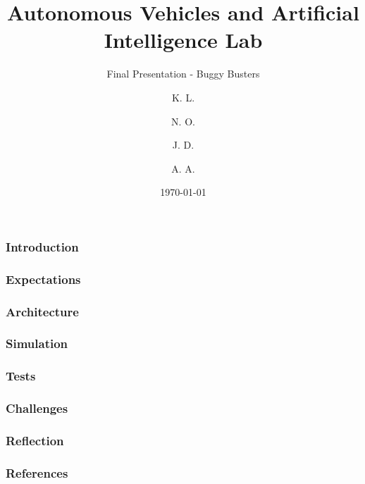 \documentclass{beamer}
\title{Autonomous Vehicles and Artificial Intelligence Lab}
\subtitle{Final Presentation - Buggy Busters}
\author{
	K. L.
	\and
	N. O.
	\and
	J. D.
	\and
	A. A.
}
\institute{Ruhr University Bochum}
\date{\today}
\begin{document}
\begin{frame}
	\titlepage
\end{frame}

\begin{frame}
	\frametitle{Introduction}
\end{frame}

\begin{frame}
	\frametitle{Expectations}
\end{frame}

\begin{frame}
	\frametitle{Architecture}
\end{frame}

\begin{frame}
	\frametitle{Simulation}
\end{frame}
\begin{frame}
	\frametitle{Tests}
\end{frame}

\begin{frame}
	\frametitle{Challenges}
\end{frame}

\begin{frame}
	\frametitle{Reflection}
\end{frame}

\begin{frame}
	\frametitle{References}
\end{frame}
\end{document}
